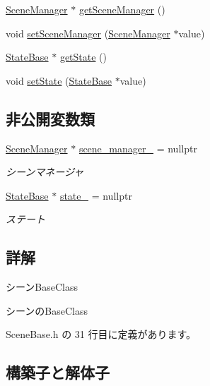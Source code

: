 \begin{DoxyCompactItemize}
\mbox{\hyperlink{class_scene_manager}{Scene\+Manager}} $\ast$ \mbox{\hyperlink{class_scene_base_aca9fd7fe190d13bcd4f5e3a832fb99c6}{get\+Scene\+Manager}} ()
\item 
void \mbox{\hyperlink{class_scene_base_aae1930cae97c27ee7d54b4bd8896a515}{set\+Scene\+Manager}} (\mbox{\hyperlink{class_scene_manager}{Scene\+Manager}} $\ast$value)
\item 
\mbox{\hyperlink{class_scene_base_1_1_state_base}{State\+Base}} $\ast$ \mbox{\hyperlink{class_scene_base_a3ff1961cc340dcfb8fa1e9ae14b269eb}{get\+State}} ()
\item 
void \mbox{\hyperlink{class_scene_base_a95d33774db6a05cf1e9da201720ea3db}{set\+State}} (\mbox{\hyperlink{class_scene_base_1_1_state_base}{State\+Base}} $\ast$value)
\end{DoxyCompactItemize}
\subsection*{非公開変数類}
\begin{DoxyCompactItemize}
\item 
\mbox{\hyperlink{class_scene_manager}{Scene\+Manager}} $\ast$ \mbox{\hyperlink{class_scene_base_af9f693449ce2472d28f692bd64d5c2ef}{scene\+\_\+manager\+\_\+}} = nullptr
\begin{DoxyCompactList}\small\item\em シーンマネージャ \end{DoxyCompactList}\item 
\mbox{\hyperlink{class_scene_base_1_1_state_base}{State\+Base}} $\ast$ \mbox{\hyperlink{class_scene_base_a9d8b7237f492e9ce0724714393b0e881}{state\+\_\+}} = nullptr
\begin{DoxyCompactList}\small\item\em ステート \end{DoxyCompactList}\end{DoxyCompactItemize}


\subsection{詳解}
シーン\+Base\+Class 

シーンの\+Base\+Class 

 Scene\+Base.\+h の 31 行目に定義があります。



\subsection{構築子と解体子}
\mbox{\label{class_scene_base_aeafd60485ad8b2191f40da3013d50f2c}} 
